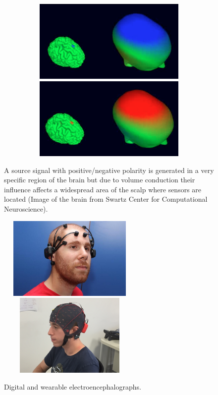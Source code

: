 \documentclass[aspectratio=169]{beamer}
\begin{document}
\begin{frame}    
\begin{figure}[]
\centering
\includegraphics[height=4cm,width=1\textwidth]{images/volconduction1.png}
\includegraphics[height=4cm,width=1\textwidth]{images/volconduction2.png}
\caption[EEG Volume Conduction]{A source signal with positive/negative polarity is generated in a very specific region of the brain but due to volume conduction their influence affects a widespread area of the scalp where sensors are located (Image of the brain from Swartz Center for Computational Neuroscience).}
\label{fig:volconduction}
\end{figure}
\end{frame}

\begin{frame}   
\begin{figure}[]
\centering
\includegraphics[height=4cm,width=7cm]{images/emotivsubject.jpg}
\includegraphics[height=4cm,width=7cm]{images/gTecsubject.jpg}
\caption[Wearable portable Digital Electroencephalograph]{Digital and wearable electroencephalographs.}
\label{fig:digitalelectroencephalograph}
\end{figure}
\end{frame}
\end{document}
